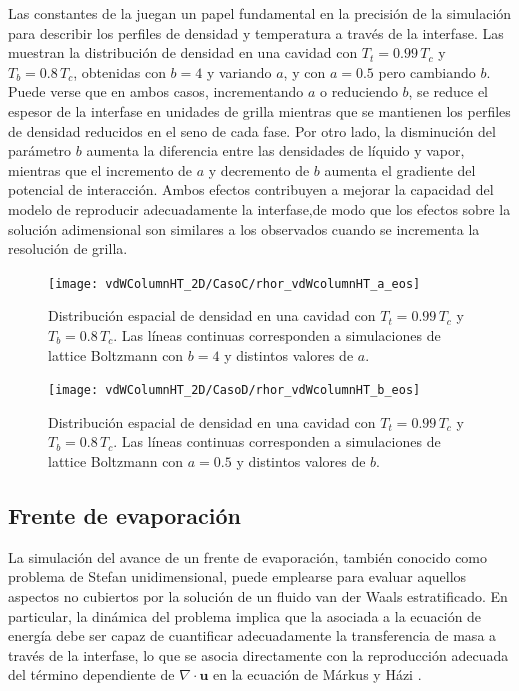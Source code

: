 Las constantes de la \eos{} juegan un papel fundamental en la precisi\'on de la simulaci\'on para describir los perfiles de densidad y temperatura a trav\'es de la interfase. Las  muestran la distribuci\'on de densidad en una cavidad con $T_t = 0.99 \, T_c$ y $T_b = 0.8 \, T_c$, obtenidas con $b=4$ y variando $a$, y con $a=0.5$ pero cambiando $b$. Puede verse que en ambos casos, incrementando $a$ o reduciendo $b$, se reduce el espesor de la interfase en unidades de grilla mientras que se mantienen los perfiles de densidad reducidos en el seno de cada fase. Por otro lado, la disminuci\'on del par\'ametro $b$ aumenta la diferencia entre las densidades de l\'iquido y vapor, mientras que el incremento de $a$ y decremento de $b$ aumenta el gradiente del potencial de interacci\'on. Ambos efectos contribuyen a mejorar la capacidad del modelo \pp{} de reproducir adecuadamente la interfase,de modo que los efectos sobre la soluci\'on adimensional son similares a los observados cuando se incrementa la resoluci\'on de grilla.

\begin{figure}[ht]
	\centering
	\texttt{[image: vdWColumnHT\_2D/CasoC/rhor\_vdWcolumnHT\_a\_eos]}
	\caption{Distribuci\'on espacial de densidad en una cavidad con $T_t = 0.99 \, T_c$ y $T_b = 0.8 \, T_c$. Las l\'ineas continuas corresponden a simulaciones de lattice Boltzmann con $b=4$ y distintos valores de $a$.}
	\label{fig:vdWColumnHT_rhor_a_eos_3D}
\end{figure}

\begin{figure}[ht]
	\centering
	\texttt{[image: vdWColumnHT\_2D/CasoD/rhor\_vdWcolumnHT\_b\_eos]}
	\caption{Distribuci\'on espacial de densidad en una cavidad con $T_t = 0.99 \, T_c$ y $T_b = 0.8 \, T_c$. Las l\'ineas continuas corresponden a simulaciones de lattice Boltzmann con $a=0.5$ y distintos valores de $b$.}
	\label{fig:vdWColumnHT_rhor_b_eos_3D}
\end{figure}
\FloatBarrier




\subsection{Frente de evaporaci\'on}

La simulaci\'on del avance de un frente de evaporaci\'on, tambi\'en conocido como problema de Stefan unidimensional, puede emplearse para evaluar aquellos aspectos no cubiertos por la soluci\'on de un fluido van der Waals estratificado. En particular, la din\'amica del problema implica que la \lbe{} asociada a la ecuaci\'on de energ\'ia debe ser capaz de cuantificar adecuadamente la transferencia de masa a trav\'es de la interfase, lo que se asocia directamente con la reproducci\'on adecuada del t\'ermino dependiente de $\nabla \cdot \bm{u}$ en la ecuaci\'on de M\'arkus y H\'azi \cite{safari_consistent_2014}.

